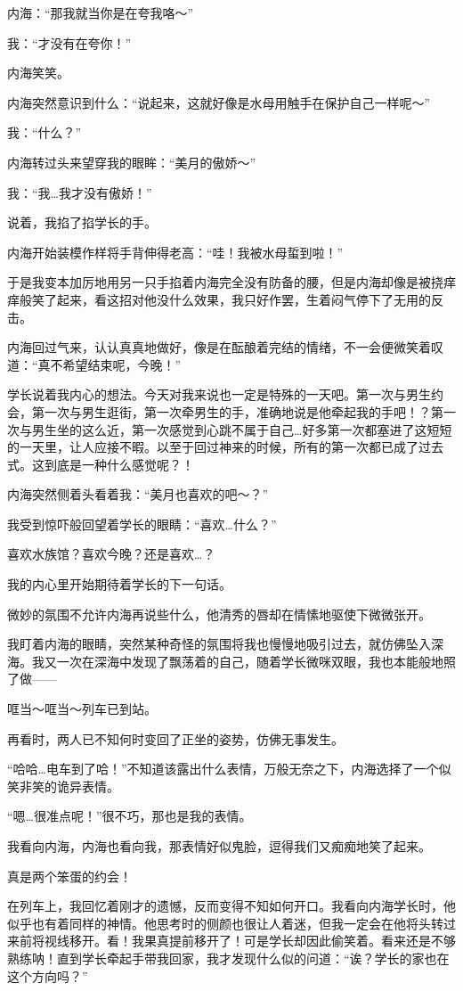 内海：“那我就当你是在夸我咯～”

我：“才没有在夸你！”

内海笑笑。

内海突然意识到什么：“说起来，这就好像是水母用触手在保护自己一样呢～”

我：“什么？”

内海转过头来望穿我的眼眸：“美月的傲娇～”

我：“我…我才没有傲娇！”

说着，我掐了掐学长的手。

内海开始装模作样将手背伸得老高：“哇！我被水母蜇到啦！”

于是我变本加厉地用另一只手掐着内海完全没有防备的腰，但是内海却像是被挠痒痒般笑了起来，看这招对他没什么效果，我只好作罢，生着闷气停下了无用的反击。

内海回过气来，认认真真地做好，像是在酝酿着完结的情绪，不一会便微笑着叹道：“真不希望结束呢，今晚！”

学长说着我内心的想法。今天对我来说也一定是特殊的一天吧。第一次与男生约会，第一次与男生逛街，第一次牵男生的手，准确地说是他牵起我的手吧！？第一次与男生坐的这么近，第一次感觉到心跳不属于自己…好多第一次都塞进了这短短的一天里，让人应接不暇。以至于回过神来的时候，所有的第一次都已成了过去式。这到底是一种什么感觉呢？！

内海突然侧着头看着我：“美月也喜欢的吧～？”

我受到惊吓般回望着学长的眼睛：“喜欢…什么？”

喜欢水族馆？喜欢今晚？还是喜欢…？

我的内心里开始期待着学长的下一句话。

微妙的氛围不允许内海再说些什么，他清秀的唇却在情愫地驱使下微微张开。

我盯着内海的眼睛，突然某种奇怪的氛围将我也慢慢地吸引过去，就仿佛坠入深海。我又一次在深海中发现了飘荡着的自己，随着学长微咪双眼，我也本能般地照了做——

哐当～哐当～列车已到站。

再看时，两人已不知何时变回了正坐的姿势，仿佛无事发生。

“哈哈…电车到了哈！”不知道该露出什么表情，万般无奈之下，内海选择了一个似笑非笑的诡异表情。

“嗯…很准点呢！”很不巧，那也是我的表情。

我看向内海，内海也看向我，那表情好似鬼脸，逗得我们又痴痴地笑了起来。

真是两个笨蛋的约会！

\newday{\love\windy\cloud\harfmoonr\night}

在列车上，我回忆着刚才的遗憾，反而变得不知如何开口。我看向内海学长时，他似乎也有着同样的神情。他思考时的侧颜也很让人着迷，但我一定会在他将头转过来前将视线移开。看！我果真提前移开了！可是学长却因此偷笑着。看来还是不够熟练呐！直到学长牵起手带我回家，我才发现什么似的问道：“诶？学长的家也在这个方向吗？”

